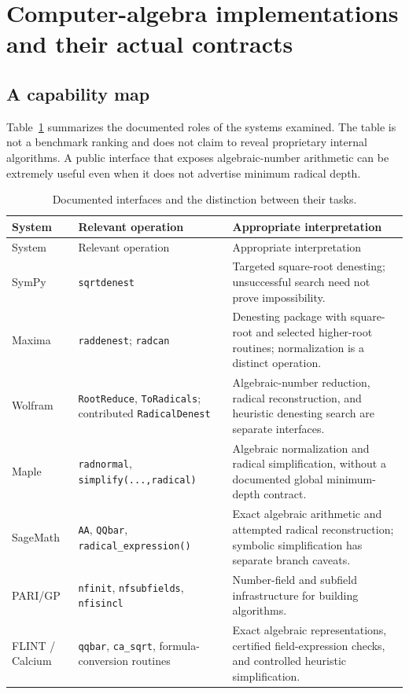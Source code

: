\documentclass[11pt,letterpaper]{article}
\numberwithin{equation}{section}
\theoremstyle{definition}
\theoremstyle{remark}
\begin{document}
\section{Computer-algebra implementations and their actual contracts}\label{sec:cas}

\subsection{A capability map}
Table~\ref{tab:cas} summarizes the documented roles of the systems examined. The table is not a benchmark ranking and does not claim to reveal proprietary internal algorithms. A public interface that exposes algebraic-number arithmetic can be extremely useful even when it does not advertise minimum radical depth.

\begin{longtable}{@{}p{}p{}p{}@{}}
\caption{Documented interfaces and the distinction between their tasks.}\label{tab:cas}\\
\toprule
System & Relevant operation & Appropriate interpretation\\
\midrule
\endfirsthead
\toprule System & Relevant operation & Appropriate interpretation\\\midrule
\endhead
\bottomrule\endfoot
SymPy & \texttt{sqrtdenest} & Targeted square-root denesting; unsuccessful search need not prove impossibility.\\[5pt]
Maxima & \texttt{raddenest}; \texttt{radcan} & Denesting package with square-root and selected higher-root routines; normalization is a distinct operation.\\[5pt]
Wolfram & \texttt{RootReduce}, \texttt{ToRadicals}; contributed \texttt{RadicalDenest} & Algebraic-number reduction, radical reconstruction, and heuristic denesting search are separate interfaces.\\[5pt]
Maple & \texttt{radnormal}, \texttt{simplify(...,radical)} & Algebraic normalization and radical simplification, without a documented global minimum-depth contract.\\[5pt]
SageMath & \texttt{AA}, \texttt{QQbar}, \texttt{radical\_expression()} & Exact algebraic arithmetic and attempted radical reconstruction; symbolic simplification has separate branch caveats.\\[5pt]
PARI/GP & \texttt{nfinit}, \texttt{nfsubfields}, \texttt{nfisincl} & Number-field and subfield infrastructure for building algorithms.\\[5pt]
FLINT / Calcium & \texttt{qqbar}, \texttt{ca\_sqrt}, formula-conversion routines & Exact algebraic representations, certified field-expression checks, and controlled heuristic simplification.\\
\end{longtable}
\end{document}
